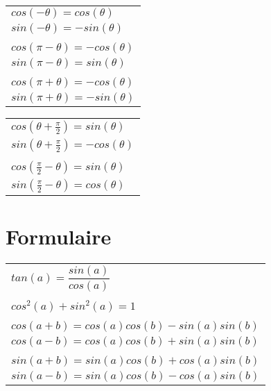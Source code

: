 \vfill
\begin{minipage}{0.5\textwidth}
\begin{center}

\end{center}
\end{minipage}
\begin{minipage}{0.5\textwidth}
\begin{tabular}{l}
	$cos(-\theta) = cos(\theta)$ \\
	$sin(-\theta) = -sin(\theta)$ \\
	\\
	$cos(\pi-\theta) = -cos(\theta)$ \\
	$sin(\pi-\theta) = sin(\theta)$ \\
	\\
	$cos(\pi+\theta) = -cos(\theta)$ \\
	$sin(\pi+\theta) = -sin(\theta)$ \\
\end{tabular}
\end{minipage} 

\vfill

\begin{minipage}{0.5\textwidth}
\begin{center}
	\hspace{0.5cm}
\end{center}
\end{minipage}
\begin{minipage}{0.5\textwidth}
	\begin{tabular}{l}
	$cos(\theta+\frac{\pi}{2}) = sin(\theta)$ \\
	$sin(\theta+\frac{\pi}{2}) = -cos(\theta)$ \\
	\\
	$cos(\frac{\pi}{2}-\theta) = sin(\theta)$ \\
	$sin(\frac{\pi}{2}-\theta) = cos(\theta)$ \\
\end{tabular}
\end{minipage}

\pagebreak

\section*{Formulaire}

	\begin{tabular}{l}

		$tan(a) = \dfrac{sin(a)}{cos(a)}$ \\
		\\
		$cos^2(a) + sin^2(a) = 1$ \\
		\\
		$cos(a+b) = cos(a)cos(b)-sin(a)sin(b)$ \\
		$cos(a-b) = cos(a)cos(b)+sin(a)sin(b)$ \\
		\\
		$sin(a+b) = sin(a)cos(b)+cos(a)sin(b)$ \\
		$sin(a-b) = sin(a)cos(b)-cos(a)sin(b)$ \\
\end{tabular}

